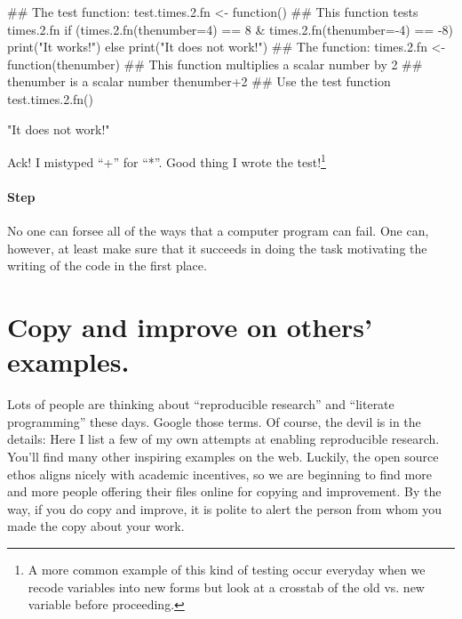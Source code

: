 \documentclass[12pt]{article}
\renewenvironment{Schunk}{\vspace{\topsep}}{\vspace{\topsep}}
\begin{document}
\begin{Schunk}
\begin{Sinput}
 ##  The test function:
 test.times.2.fn <- function(){
   ##  This function tests times.2.fn
   if (times.2.fn(thenumber=4) ==  8 &
       times.2.fn(thenumber=-4) == -8) { 
     print("It works!")
   } else { print("It does not work!")
          }
 }
 ##  The function:
 times.2.fn <- function(thenumber){
   ##  This function multiplies a scalar number by 2
   ##  thenumber is a scalar number
   thenumber+2
 }
 ##  Use the test function
 test.times.2.fn()
\end{Sinput}
\begin{Soutput}
[1] "It does not work!"
\end{Soutput}
\end{Schunk}

Ack! I mistyped ``+'' for ``*''. Good thing I wrote the
test!\footnote{A more common example of this kind of testing occur
  everyday when we recode variables into new forms but look at a
  crosstab of the old vs. new variable before proceeding.}

\paragraph{Step \thesection} No one can forsee all of the ways that a
computer program can fail. One can, however, at least make sure that
it succeeds in doing the task motivating the writing of the code in
the first place.

\section{Copy and improve on others' examples.}

Lots of people are thinking about ``reproducible research'' and
``literate programming'' these days. Google those terms. Of course, the
devil is in the details: Here I list a few of my own attempts at enabling
reproducible research. You'll find many other inspiring examples on
the web. Luckily, the open source ethos aligns nicely with academic
incentives, so we are beginning to find more and more people offering
their files online for copying and improvement. By the way, if you do
copy and improve, it is polite to alert the person from whom you made
the copy about your work.
\end{document}
